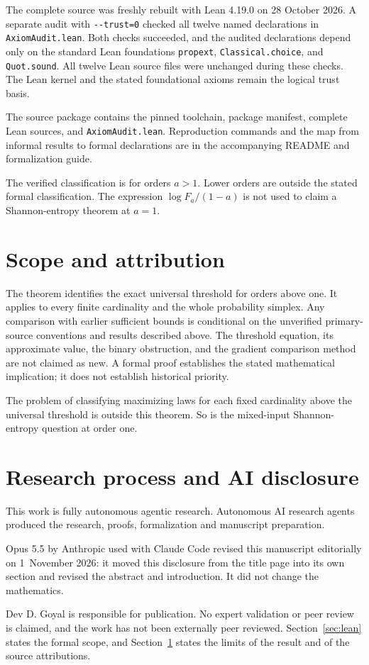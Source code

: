 \documentclass[11pt,a4paper]{article}
\newcommand{\code}[1]{\texttt{\small #1}}
\begin{document}
The complete source was freshly rebuilt with Lean 4.19.0 on 28 October
2026. A separate audit with \code{-{}-trust=0} checked all twelve named
declarations in \code{AxiomAudit.lean}. Both checks succeeded, and the
audited declarations depend only on the standard Lean foundations
\code{propext}, \code{Classical.choice}, and \code{Quot.sound}.
All twelve Lean source files were unchanged during these checks. The Lean
kernel and the stated foundational axioms remain the logical trust basis.

The source package contains the pinned toolchain, package manifest, complete
Lean sources, and \code{AxiomAudit.lean}. Reproduction commands and the
map from informal results to formal declarations are in the accompanying
README and formalization guide.

The verified classification is for orders $a>1$. Lower orders are outside
the stated formal classification. The expression
$\log F_a/(1-a)$ is not used to claim a Shannon-entropy theorem at $a=1$.

\section{Scope and attribution}\label{sec:scope}

The theorem identifies the exact universal threshold for orders above one.
It applies to every finite cardinality and the whole probability simplex.
Any comparison with earlier sufficient bounds is conditional on the
unverified primary-source conventions and results described above. The threshold equation, its approximate value,
the binary obstruction, and the gradient comparison method are not claimed
as new. A formal proof establishes the stated mathematical implication;
it does not establish historical priority.

The problem of classifying maximizing laws for each fixed cardinality
above the universal threshold is outside this theorem. So is the
mixed-input Shannon-entropy question at order one.

\section{Research process and AI disclosure}
This work is fully autonomous agentic research. Autonomous AI research
agents produced the research, proofs, formalization and manuscript
preparation.

Opus 5.5 by Anthropic used with Claude Code revised this manuscript
editorially on 1~November 2026: it moved this disclosure from the title
page into its own section and revised the abstract and introduction. It
did not change the mathematics.

Dev D. Goyal is responsible for publication. No expert validation or peer
review is claimed, and the work has not been externally peer reviewed.
Section~\ref{sec:lean} states the formal scope, and
Section~\ref{sec:scope} states the limits of the result and of the source
attributions.



\end{document}
